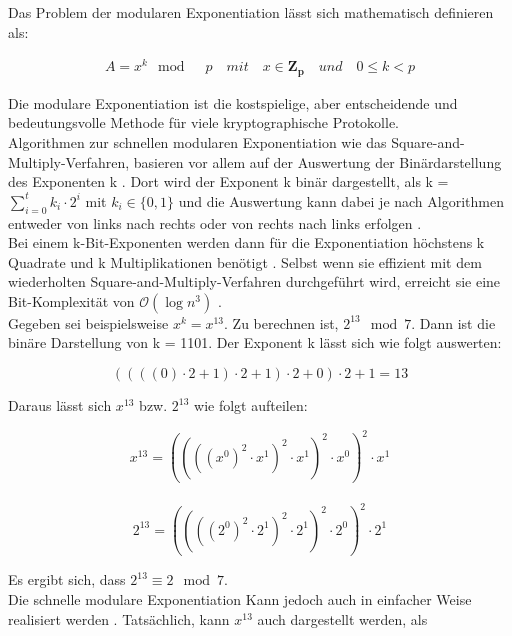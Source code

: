 Das Problem der modularen Exponentiation lässt sich mathematisch definieren als:
\begin{ceqn}

\begin{align*}
   A = x^k \mod \quad p \quad mit \quad x \in \mathbf{Z_p} \quad und \quad 0 \leq k < p
\end{align*}

\end{ceqn}

Die modulare Exponentiation ist die kostspielige, aber
entscheidende und bedeutungsvolle Methode für viele kryptographische Protokolle. \\

Algorithmen zur schnellen modularen Exponentiation wie das Square-and-Multiply-Verfahren, basieren vor
allem auf der Auswertung der Binärdarstellung des Exponenten k \cite{lang}. 
Dort wird der Exponent k binär dargestellt, als k = \(\sum_{i=0}^{t} k_i \cdot 2^i\) mit $ k_i \in \{0, 1\}$ und die Auswertung kann dabei je nach Algorithmen entweder von links nach rechts oder von rechts nach links erfolgen \cite{lang}. \\

Bei einem k-Bit-Exponenten werden dann für die Exponentiation höchstens k Quadrate und k Multiplikationen benötigt \cite{lang}.
Selbst wenn sie effizient mit dem wiederholten Square-and-Multiply-Verfahren durchgeführt wird, erreicht sie eine Bit-Komplexität von $\mathcal{O}(\log{}n^3)$ \cite{menezes:1997}.  \\

Gegeben sei beispielsweise \(x^k = x^{13}\). Zu berechnen ist, \( 2^{13} \mod 7\).
Dann ist die binäre Darstellung von k = 1101. Der Exponent k lässt sich wie folgt auswerten:
\begin{ceqn}
  \[((((0) \cdot 2 + 1) \cdot 2 + 1) \cdot 2 + 0) \cdot 2 + 1   =   13 \]
\end{ceqn}

Daraus lässt sich $ x^{13} $ bzw. $ 2^{13}$ wie folgt aufteilen:
\begin{ceqn}
   \[ x^{13} = ((((x^0)^2 \cdot x^1)^2 \cdot x^1)^2 \cdot x^0)^2 \cdot x^1 \] \\
   \[ 2^{13} = ((((2^0)^2 \cdot 2^1)^2 \cdot 2^1)^2 \cdot 2^0)^2 \cdot 2^1 \] 
\end{ceqn}

Es ergibt sich, dass \( 2^{13} \equiv 2 \mod 7\).\\

Die schnelle modulare Exponentiation Kann jedoch auch in einfacher Weise realisiert werden \cite{lang}. Tatsächlich, kann \( x^{13}\) auch dargestellt werden, als 

